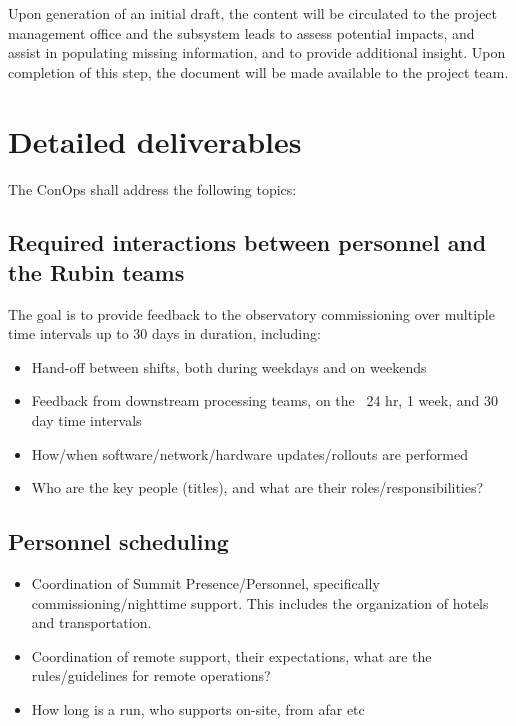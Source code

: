 \documentclass[SE,authoryear,toc]{lsstdoc}
\begin{document}
Upon generation of an initial draft, the content will be circulated to the project management office and the subsystem leads to assess potential impacts, and assist in populating missing information, and to provide additional insight. Upon completion of this step, the document will be made available to  the project team. 

\section{Detailed deliverables}
The ConOps shall address the following topics:

\subsection{Required interactions between personnel and the Rubin teams}
The goal is to provide feedback to the observatory commissioning over multiple time intervals up to 30 days in duration, including:
\begin{itemize}
\item Hand-off between shifts, both during weekdays and on weekends
\item Feedback from downstream processing teams, on the ~24 hr, 1 week, and 30 day time intervals
\item How/when software/network/hardware updates/rollouts are performed
\item Who are the key people (titles), and what are their roles/responsibilities?
\end{itemize}

\subsection{Personnel scheduling}
\begin{itemize}
\item Coordination of Summit Presence/Personnel, specifically commissioning/nighttime support. This includes the organization of hotels and transportation.
\item Coordination of remote support, their expectations, what are the rules/guidelines for remote operations?
\item How long is a run, who supports on-site, from afar etc
\end{itemize}
\end{document}
